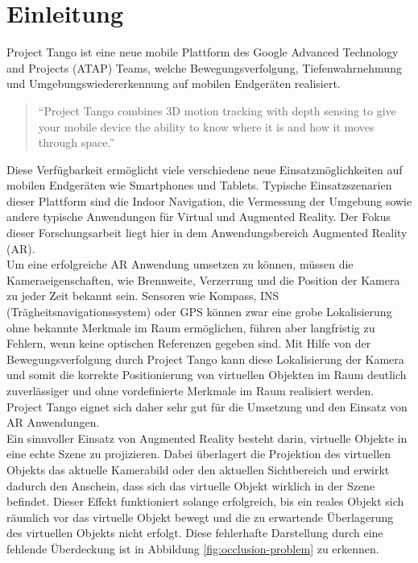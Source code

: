 \chapter{Einleitung}

Project Tango ist eine neue mobile Plattform des Google Advanced Technology and Projects (ATAP) Teams, welche Bewegungsverfolgung, Tiefenwahrnehmung und Umgebungswiedererkennung auf mobilen Endgeräten realisiert.

\begin{quotation}
\enquote{Project Tango combines 3D motion tracking with depth sensing to give your mobile device the ability to know where it is and how it moves through space.}  \citep{Proje19:online}
\end{quotation}

Diese Verfügbarkeit ermöglicht viele verschiedene neue Einsatzmöglichkeiten auf mobilen Endgeräten wie Smartphones und Tablets. Typische Einsatzszenarien dieser Plattform sind die Indoor Navigation, die Vermessung der Umgebung sowie andere typische Anwendungen für Virtual und Augmented Reality. Der Fokus dieser Forschungsarbeit liegt hier in dem Anwendungsbereich Augmented Reality (AR). \\

Um eine erfolgreiche AR Anwendung umsetzen zu können, müssen die Kameraeigenschaften, wie Brennweite, Verzerrung und die Position der Kamera zu jeder Zeit bekannt sein. Sensoren wie Kompass, INS (Trägheits\-navigations\-system) oder GPS können zwar eine grobe Lokalisierung ohne bekannte Merkmale im Raum ermöglichen, führen aber langfristig zu Fehlern, wenn keine optischen Referenzen gegeben sind. Mit Hilfe von der Bewegungsverfolgung durch Project Tango kann diese Lokalisierung der Kamera und somit die korrekte Positionierung von virtuellen Objekten im Raum deutlich zuverlässiger und ohne vordefinierte Merkmale im Raum realisiert werden. Project Tango eignet sich daher sehr gut für die Umsetzung und den Einsatz von AR Anwendungen.\\

Ein sinnvoller Einsatz von Augmented Reality besteht darin, virtuelle Objekte in eine echte Szene zu projizieren. Dabei überlagert die Projektion des virtuellen Objekts das aktuelle Kamerabild oder den aktuellen Sichtbereich und erwirkt dadurch den Anschein, dass sich das virtuelle Objekt wirklich in der Szene befindet. Dieser Effekt funktioniert solange erfolgreich, bis ein reales Objekt sich räumlich vor das virtuelle Objekt bewegt und die zu erwartende Überlagerung des virtuellen Objekts nicht erfolgt. Diese fehlerhafte Darstellung durch eine fehlende Überdeckung ist in Abbildung \ref{fig:occlusion-problem} zu erkennen. \\

